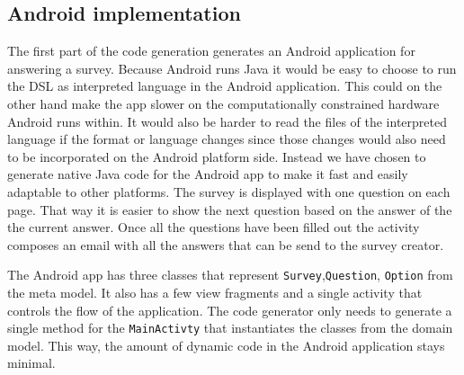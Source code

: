 \documentclass[runningheads]{llncs}
\begin{document}
\subsection{Android implementation}
The first part of the code generation generates an Android application for answering a survey. Because Android runs Java it would be easy to choose to run the DSL as interpreted language in the Android application. This could on the other hand make the app slower on the computationally constrained hardware Android runs within. It would also be harder to read the files of the interpreted language if the format or language changes since those changes would also need to be incorporated on the Android platform side. Instead we have chosen to generate native Java code for the Android app to make it fast and easily adaptable to other platforms.
The survey is displayed with one question on each page. That way it is easier to show the next question based on the answer of the the current answer. Once all the questions have been filled out the activity composes an email with all the answers that can be send to the survey creator.

The Android app has three classes that represent \texttt{Survey},\texttt{Question}, \texttt{Option} from the meta model. It also has a few view fragments and a single activity that controls the flow of the application. The code generator only needs to generate a single method for the \texttt{MainActivty} that instantiates the classes from the domain model. This way, the amount of dynamic code in the Android application stays minimal.


\end{document}
